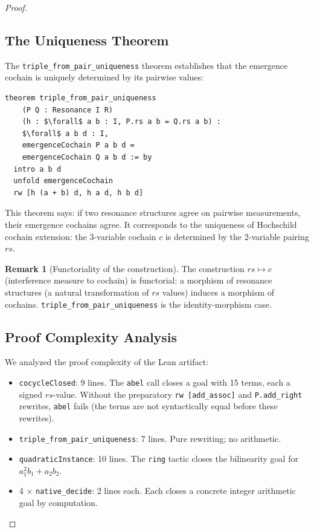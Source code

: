 \documentclass[acmsmall,sigplan,anonymous,review,screen]{acmart}
\theoremstyle{plain}
\theoremstyle{definition}
\newtheorem{remark}[theorem]{Remark}
\newcommand{\rs}{\mathit{rs}}
\newcommand{\lean}[1]{\texttt{#1}}
\begin{document}
\begin{proof}
\subsection{The Uniqueness Theorem}
\label{sec:lean:unique}

The \lean{triple\_from\_pair\_uniqueness} theorem establishes that the
emergence cochain is uniquely determined by its pairwise values:

\begin{lstlisting}[frame=single]
theorem triple_from_pair_uniqueness
    (P Q : Resonance I R)
    (h : $\forall$ a b : I, P.rs a b = Q.rs a b) :
    $\forall$ a b d : I,
    emergenceCochain P a b d =
    emergenceCochain Q a b d := by
  intro a b d
  unfold emergenceCochain
  rw [h (a + b) d, h a d, h b d]
\end{lstlisting}

This theorem says: if two resonance structures agree on pairwise
measurements, their emergence cochains agree.  It corresponds to the
uniqueness of Hochschild cochain extension: the 3-variable cochain $c$
is determined by the 2-variable pairing $\rs$.

\begin{remark}[Functoriality of the construction]
  The construction $\rs \mapsto c$ (interference measure to cochain) is
  functorial: a morphism of resonance structures (a natural transformation
  of $\rs$ values) induces a morphism of cochains.
  \lean{triple\_from\_pair\_uniqueness} is the identity-morphism case.
\end{remark}

\subsection{Proof Complexity Analysis}
\label{sec:lean:complexity}

We analyzed the proof complexity of the Lean artifact:

\begin{itemize}[itemsep=2pt]
  \item \lean{cocycleClosed}: 9 lines.  The \lean{abel} call closes a goal
    with 15 terms, each a signed $\rs$-value.  Without the preparatory
    \lean{rw [add\_assoc]} and \lean{P.add\_right} rewrites, \lean{abel}
    fails (the terms are not syntactically equal before these rewrites).
  \item \lean{triple\_from\_pair\_uniqueness}: 7 lines.  Pure rewriting;
    no arithmetic.
  \item \lean{quadraticInstance}: 10 lines.  The \lean{ring} tactic
    closes the bilinearity goal for $a_1^2 b_1 + a_2 b_2$.
  \item 4 $\times$ \lean{native\_decide}: 2 lines each.  Each closes
    a concrete integer arithmetic goal by computation.
\end{itemize}


\end{proof}
\end{document}
